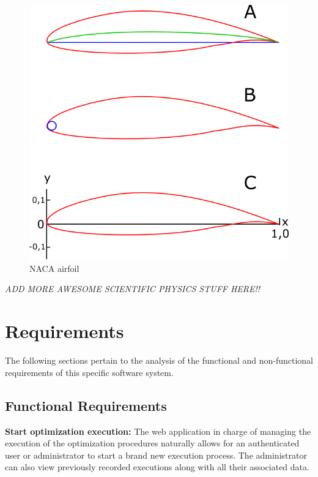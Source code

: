 \documentclass{article}
\begin{document}
\begin{figure}[h!]
\centering
\includegraphics[scale=0.15]{images/airfoil.png}
\caption{NACA airfoil \cite{airfoil_wikipedia}}
\label{fig:nacaairfoil}
\end{figure}


\textit{ADD MORE AWESOME SCIENTIFIC PHYSICS STUFF HERE!!}


\section{Requirements}

The following sections pertain to the analysis of the functional and non-functional requirements of this specific software system.

\subsection{Functional Requirements}


\noindent\textbf{Start optimization execution:}
The web application in charge of managing the execution of the optimization procedures naturally allows for an authenticated user or administrator to start a brand new execution process. The administrator can also view previously recorded executions along with all their associated data.\\\par
\end{document}
